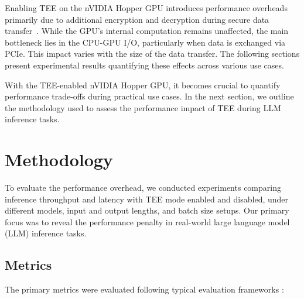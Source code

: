 \documentclass{article}
\begin{document}
Enabling TEE on the nVIDIA Hopper GPU introduces performance overheads primarily due to additional encryption and decryption during secure data transfer~\cite{mohan2024securing}. While the GPU’s internal computation remains unaffected, the main bottleneck lies in the CPU-GPU I/O, particularly when data is exchanged via PCIe. This impact varies with the size of the data transfer. The following sections present experimental results quantifying these effects across various use cases.

With the TEE-enabled nVIDIA Hopper GPU, it becomes crucial to quantify performance trade-offs during practical use cases. In the next section, we outline the methodology used to assess the performance impact of TEE during LLM inference tasks.

\section{Methodology}

To evaluate the performance overhead, we conducted experiments comparing inference throughput and latency with TEE mode enabled and disabled, under different models, input and output lengths, and batch size setups. Our primary focus was to reveal the performance penalty in real-world large language model (LLM) inference tasks.

\subsection{Metrics}

The primary metrics were evaluated following typical evaluation frameworks \cite{agrawal2024metron}:
\end{document}
